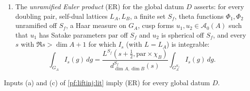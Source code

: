 \begin{definition}
\begin{enumerate}[label=(\alph*)]
\item The \emph{unramified Euler product} (ER) for the global datum $D$ asserts: for every doubling pair, self-dual lattices $L_A,L_B$, a finite set
$S_f$, theta functions $\Phi_1,\Phi_2$ unramified off $S_f$, a Haar measure on $G_A$, cusp forms $u_1,u_2\in\mathcal A_0(A)$ such that $u_1$ has Satake
parameters $\mathrm{par}$ off $S_f$ and $u_2$ is spherical off $S_f$, and every $s$ with $\Re s>\dim A+1$ for which $I_s$ (with $L=L_A$) is
integrable:
\begin{equation}\label{eq:pf:liftinj:ER}
\int_{G_A}I_s(g)\,dg=\frac{L^{S_f}(s+\frac12,\mathrm{par}\times\chi_B)}{d^{S_f}_{\dim A,\dim B}(s)}
\int_{G_A^{S_f}}I_s(g)\,dg .
\end{equation}
\end{enumerate}
\end{definition}

\begin{proposition}\label{pf:liftinj:euler}
Inputs (a) and (c) of \cref{pf:liftinj:lit} imply (ER) for every global datum $D$.
\end{proposition}

